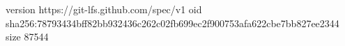 version https://git-lfs.github.com/spec/v1
oid sha256:78793434bff82bb932436c262c02fb699ec2f900753afa622cbe7bb827ee2344
size 87544
